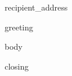 \documentclass{letter}
\date{{{date}}}
\begin{document}
\begin{letter}{{{recipient_address}}}
\opening{{{greeting}}}

{{body}}

\closing{{{closing}}}

\end{letter}
\end{document}
